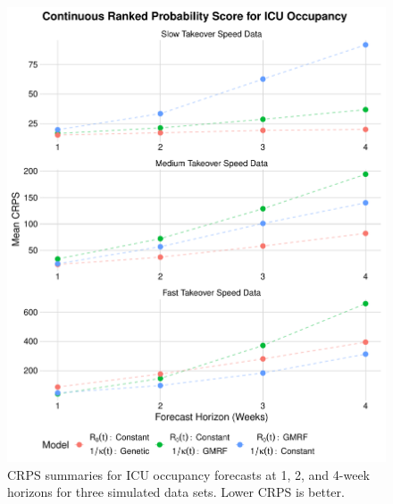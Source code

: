 \begin{figure}
    \centering
    \includegraphics[width=1.0\columnwidth]{simulated_crps_comparison_dotplot_data_icu_plot}
    \caption{CRPS summaries for ICU occupancy forecasts at 1, 2, and 4-week horizons for three simulated data sets. Lower CRPS is better.}
    \label{ch_5:fig:simulated_crps_comparison_dotplot_data_icu_plot}
\end{figure}

